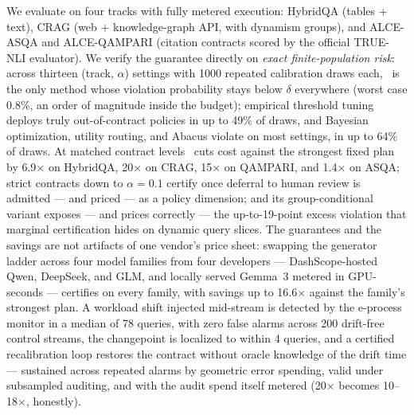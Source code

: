 We evaluate on four tracks with fully metered execution: HybridQA
(tables + text), CRAG (web + knowledge-graph API,
with dynamism groups), and ALCE-ASQA and ALCE-QAMPARI (citation
contracts scored by the official TRUE-NLI evaluator). We verify the
guarantee directly on \emph{exact finite-population risk}: across
thirteen (track, $\alpha$) settings with 1000 repeated calibration
draws each, \system\ is the only method whose violation probability
stays below $\delta$ everywhere (worst case 0.8\%, an order of
magnitude inside the budget); empirical threshold tuning deploys truly
out-of-contract policies in up to 49\% of draws, and Bayesian
optimization, utility routing, and Abacus violate on most settings, in
up to 64\% of draws. At matched contract levels \system\ cuts cost
against the strongest fixed plan by 6.9$\times$ on HybridQA,
20$\times$ on CRAG, 15$\times$ on QAMPARI, and 1.4$\times$ on ASQA;
strict contracts down to $\alpha = 0.1$ certify once deferral to human
review is admitted --- and priced --- as a policy dimension; and its
group-conditional variant exposes --- and prices correctly --- the
up-to-19-point excess violation that marginal certification hides on
dynamic query slices. The guarantees and the savings are not artifacts
of one vendor's price sheet: swapping the generator ladder across four
model families from four developers --- DashScope-hosted Qwen,
DeepSeek, and GLM, and locally served Gemma~3 metered in GPU-seconds
--- certifies on every family, with savings up to 16.6$\times$ against
the family's strongest plan. A workload shift injected mid-stream is
detected by the e-process monitor in a median of 78 queries, with zero
false alarms across 200 drift-free control streams, the changepoint is
localized to within 4 queries, and a certified recalibration loop
restores the contract without oracle knowledge of the drift time ---
sustained across repeated alarms by geometric error spending, valid
under subsampled auditing, and with the audit spend itself metered
(20$\times$ becomes 10--18$\times$, honestly).

